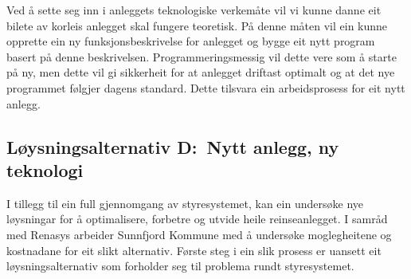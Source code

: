 Ved å sette seg inn i anleggets teknologiske verkemåte vil vi kunne danne eit bilete av korleis anlegget skal fungere teoretisk.
På denne måten vil ein kunne opprette ein ny funksjonsbeskrivelse for anlegget og bygge eit nytt program basert på denne beskrivelsen.
Programmeringsmessig vil dette vere som å starte på ny, men dette vil gi sikkerheit for at anlegget driftast optimalt og at det nye programmet følgjer
dagens standard. Dette tilsvara ein arbeidsprosess for eit nytt anlegg.

\newpage
\subsection{Løysningsalternativ D:~Nytt anlegg, ny teknologi}
I tillegg til ein full gjennomgang av styresystemet, 
kan ein undersøke nye løysningar for å optimalisere, forbetre og utvide heile reinseanlegget.
I samråd med \gls{Renasys} arbeider \gls{Sunnfjord Kommune} med å undersøke moglegheitene og kostnadane for eit slikt alternativ.
Første steg i ein slik prosess er uansett eit løysningsalternativ som forholder seg til problema rundt styresystemet.


